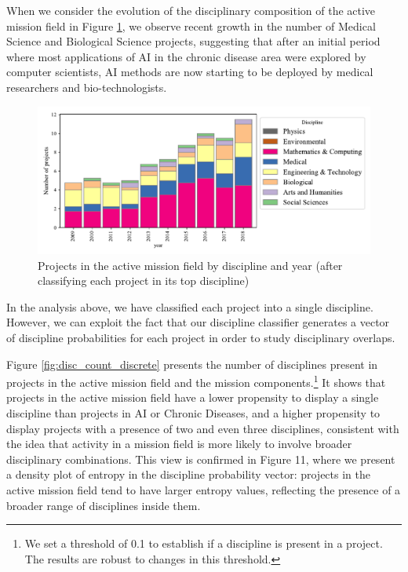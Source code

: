 \documentclass[11pt]{article}
\begin{document}
When we consider the evolution of the disciplinary composition of the active mission field in Figure \ref{fig:disc_mix}, we observe recent growth in the number of Medical Science and Biological Science projects, suggesting that after an initial period where most applications of AI in the chronic disease area were explored by computer scientists, AI methods are now starting to be deployed by medical researchers and bio-technologists.

\begin{figure}[!ht]
    \centering
    \includegraphics[width=\textwidth]{figures/fig_9_disc_trends.pdf}
    \caption{Projects in the active mission field by discipline and year (after classifying each project in its top discipline)}
    \label{fig:disc_mix}
\end{figure}

In the analysis above, we have classified each project into a single discipline. However, we can exploit the fact that our discipline classifier generates a vector of discipline probabilities for each project in order to study disciplinary overlaps. 

Figure \ref{fig:disc_count_discrete} presents the number of disciplines present in projects in the active mission field and the mission components.\footnote{We set a threshold of 0.1 to establish if a discipline is present in a project. The results are robust to changes in this threshold.} It shows that projects in the active mission field have a lower propensity to display a single discipline than projects in AI or Chronic Diseases, and a higher propensity to display projects with a presence of two and even three disciplines, consistent with the idea that activity in a mission field is more likely to involve broader disciplinary combinations. This view is confirmed in Figure 11, where we present a density plot of entropy in the discipline probability vector: projects in the active mission field tend to have larger entropy values, reflecting the presence of a broader range of disciplines inside them.
\end{document}
